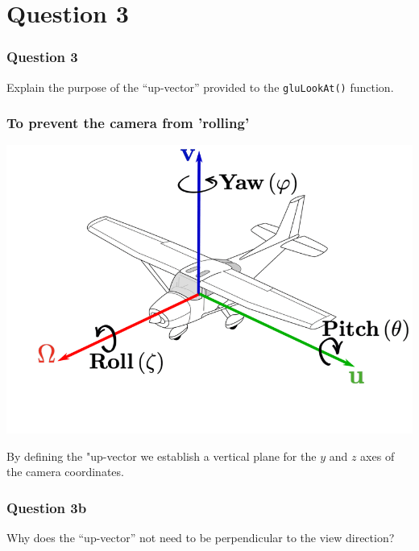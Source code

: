 \documentclass{beamer}
\begin{document}
\section{Question 3}

\begin{frame}
    \frametitle{Question 3}
    Explain the purpose of the “up-vector” provided to the \texttt{gluLookAt()} function. 
\end{frame}

\begin{frame}
    \frametitle{To prevent the camera from 'rolling'}

    \begin{center}
        \includegraphics[scale=0.3]{yaw-pitch-roll.png}
    \end{center}

    By defining the "up-vector  we establish a vertical plane for the $y$ and $z$ axes of the camera coordinates.
\end{frame}

\begin{frame}
    \frametitle{Question 3b}

    Why does the “up-vector” not need to be perpendicular to the view direction?

\end{frame}
\end{document}
